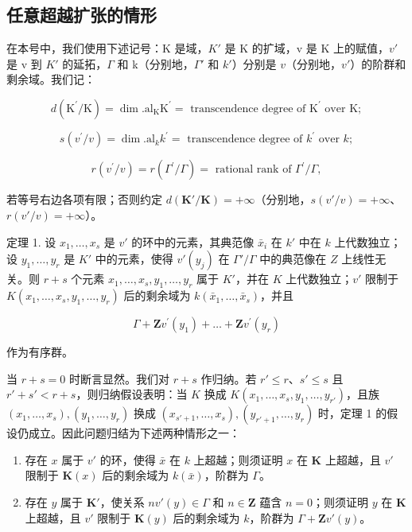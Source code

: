 \subsection{任意超越扩张的情形}

在本号中，我们使用下述记号：K 是域，\(K'\) 是 K 的扩域，v 是 K 上的赋值，\(v'\) 是 v 到 \(K'\) 的延拓，\(\Gamma\) 和 k（分别地，\(\Gamma'\) 和 \(k'\)）分别是 \(v\)（分别地，\(v'\)）的阶群和剩余域。我们记：

\[
d \left(\mathrm{K} ^ {\prime} / \mathrm{K}\right) = \dim . \mathrm{al} _ {\mathrm{K}} \mathrm{K} ^ {\prime} = \text { transcendence   degree   of } \mathrm{K} ^ {\prime} \text { over } \mathrm{K};
\]

\[
s (v ^ {\prime} / v) = \dim . \mathrm{al} _ {k} k ^ {\prime} = \text { transcendence   degree   of } k ^ {\prime} \text { over } k;
\]

\[
r (v ^ {\prime} / v) = r (\Gamma^ {\prime} / \Gamma) = \text { rational   rank   of } \Gamma^ {\prime} / \Gamma ,
\]

若等号右边各项有限；否则约定 \(d(\mathbf{K}' / \mathbf{K}) = +\infty\)（分别地，\(s(v' / v) = +\infty\)、\(r(v' / v) = +\infty\)）。

定理 1. 设 \(x_1, \ldots, x_s\) 是 \(v'\) 的环中的元素，其典范像 \(\bar{x}_i\) 在 \(k'\) 中在 \(k\) 上代数独立；设 \(y_1, \ldots, y_r\) 是 \(K'\) 中的元素，使得 \(v'(y_j)\) 在 \(\Gamma'/\Gamma\) 中的典范像在 \(Z\) 上线性无关。则 \(r + s\) 个元素 \(x_1, \ldots, x_s, y_1, \ldots, y_r\) 属于 \(K'\)，并在 \(K\) 上代数独立；\(v'\) 限制于 \(K(x_1, \ldots, x_s, y_1, \ldots, y_r)\) 后的剩余域为 \(k(\bar{x}_1, \ldots, \bar{x}_s)\)，并且

\[
\Gamma + \mathbf {Z} v ^ {\prime} (y _ {1}) + \dots + \mathbf {Z} v ^ {\prime} (y _ {r})
\]

作为有序群。

当 \(r + s = 0\) 时断言显然。我们对 \(r + s\) 作归纳。若 \(r' \leqslant r\)、\(s' \leqslant s\) 且 \(r' + s' < r + s\)，则归纳假设表明：当 \(K\) 换成 \(K(x_1, \ldots, x_s, y_1, \ldots, y_{r'})\)，且族 \((x_1, \ldots, x_s), (y_1, \ldots, y_r)\) 换成 \((x_{s'+1}, \ldots, x_s), (y_{r'+1}, \ldots, y_r)\) 时，定理 1 的假设仍成立。因此问题归结为下述两种情形之一：

\begin{enumerate}
\def\labelenumi{(\alph{enumi})}
\item
  存在 \(x\) 属于 \(v'\) 的环，使得 \(\bar{x}\) 在 \(k\) 上超越；则须证明 \(x\) 在 \(\mathbf{K}\) 上超越，且 \(v'\) 限制于 \(\mathbf{K}(x)\) 后的剩余域为 \(k(\bar{x})\)，阶群为 \(\Gamma\)。
\item
  存在 \(y\) 属于 \(\mathbf{K}'\)，使关系 \(nv'(y) \in \Gamma\) 和 \(n \in \mathbf{Z}\) 蕴含 \(n = 0\)；则须证明 \(y\) 在 \(\mathbf{K}\) 上超越，且 \(v'\) 限制于 \(\mathbf{K}(y)\) 后的剩余域为 \(k\)，阶群为 \(\Gamma + \mathbf{Z}v'(y)\)。
\end{enumerate}


